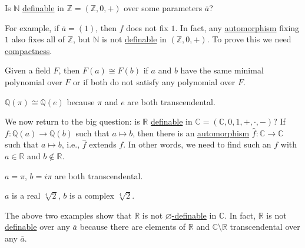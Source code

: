 \begin{problem*}
	Is \(\mathbb{N} \) \hyperref[def:definable]{definable} in \(\mathbb{Z} =(\mathbb{Z} , 0, +)\) over some parameters \(\overline{a} \)?
\end{problem*}
\begin{answer}
	For example, if \(\overline{a} =(1)\), then \(f\) does not fix \(1\). In fact, any \hyperref[def:automorphism]{automorphism} fixing \(1\) also fixes all of \(\mathbb{Z} \), but \(\mathbb{N} \) is not \hyperref[def:definable]{definable} in \((\mathbb{Z} , 0, +)\). To prove this we need \hyperref[thm:compactness]{compactness}.
\end{answer}

\begin{prev}
	Given a field \(F\), then \(F(a) \cong F(b)\) if \(a\) and \(b\) have the same minimal polynomial over \(F\) or if both do not satisfy any polynomial over \(F\).
\end{prev}

\begin{eg}
	\(\mathbb{Q} (\pi ) \cong \mathbb{Q} (e)\) because \(\pi \) and \(e\) are both transcendental.
\end{eg}

We now return to the big question: is \(\mathbb{R} \) \hyperref[def:definable]{definable} in \(\mathbb{C} = (\mathbb{C} , 0, 1, +, \cdot, -)\)? If \(f\colon \mathbb{Q} (a) \to  \mathbb{Q} (b)\) such that \(a\mapsto b\), then there is an \hyperref[def:automorphism]{automorphism} \(\hat{f} \colon \mathbb{C} \to  \mathbb{C} \) such that \(a\mapsto b\), i.e., \(\hat{f} \) extends \(f\). In other words, we need to find such an \(f\) with \(a\in \mathbb{R} \) and \(b\notin \mathbb{R} \).

\begin{eg}
	\(a = \pi \), \(b = i \pi \) are both transcendental.
\end{eg}

\begin{eg}
	\(a\) is a real \(\sqrt[4]{2}\), \(b\) is a complex \(\sqrt[4]{2} \).
\end{eg}

The above two examples show that \(\mathbb{R} \) is not \hyperref[def:definable]{\(\varnothing \)-definable} in \(\mathbb{C} \). In fact, \(\mathbb{R} \) is not \hyperref[def:definable]{definable} over any \(\overline{a} \) because there are elements of \(\mathbb{R} \) and \(\mathbb{C} \setminus \mathbb{R} \) transcendental over any \(\overline{a} \).

